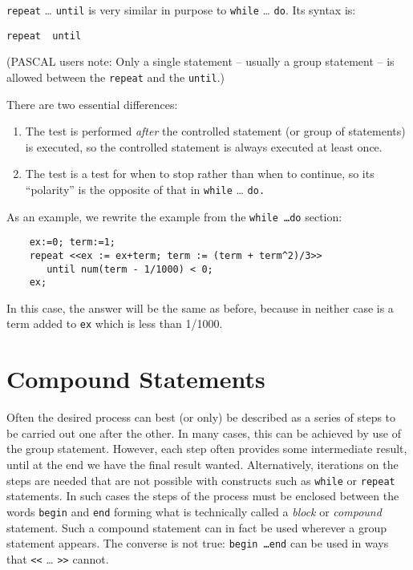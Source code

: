 \texttt{repeat} \ldots{} \texttt{until} is very similar
in purpose to \texttt{while} \ldots{} \texttt{do}.  Its syntax is:
\begin{syntax}
  \texttt{repeat }\texttt{ until }
\end{syntax}
(PASCAL users note: Only a single statement -- usually a group statement
-- is allowed between the \texttt{repeat} and the \texttt{until}.)

There are two essential differences:
\begin{enumerate}
\item The test is performed \emph{after} the controlled statement (or group of
statements) is executed, so the controlled statement is always executed at
least once.

\item The test is a test for when to stop rather than when to continue, so its
``polarity'' is the opposite of that in \texttt{while} \ldots{} \texttt{do.}
\end{enumerate}

As an example, we rewrite the example from the \texttt{while \ldots do} section:
\begin{samepage}
\begin{verbatim}
    ex:=0; term:=1;
    repeat <<ex := ex+term; term := (term + term^2)/3>>
       until num(term - 1/1000) < 0;
    ex;
\end{verbatim}
\end{samepage}
In this case, the answer will be the same as before, because in neither
case is a term added to \texttt{ex} which is less than 1/1000.

\section{Compound Statements}
\hypertarget{command:BEGIN}{}

Often the desired process
can best (or only) be
described as a series of steps to be carried out one after the other.  In
many cases, this can be achieved by use of the group statement.  However, each step often provides some intermediate
result, until at the end we have the final result wanted.  Alternatively,
iterations on the steps are needed that are not possible with constructs
such as \texttt{while} or \texttt{repeat}
statements.  In such cases the steps of the process must be
enclosed between the words \texttt{begin} and \texttt{end} forming what is technically called a \emph{block} or
\emph{compound} statement.  Such a compound statement can in fact be used
wherever a group statement appears.  The converse is not true: \texttt{begin
\ldots end} can be used in ways
that \texttt{<}\texttt{<} \ldots{} \texttt{>}\texttt{>} cannot.


